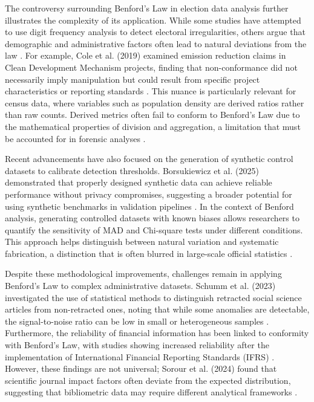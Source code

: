 \documentclass[11pt,a4paper]{article}
\begin{document}
The controversy surrounding Benford's Law in election data analysis further illustrates the complexity of its application. While some studies have attempted to use digit frequency analysis to detect electoral irregularities, others argue that demographic and administrative factors often lead to natural deviations from the law \cite{Cole2019TestingTE}. For example, Cole et al. (2019) examined emission reduction claims in Clean Development Mechanism projects, finding that non-conformance did not necessarily imply manipulation but could result from specific project characteristics or reporting standards \cite{Cole2019TestingTE}. This nuance is particularly relevant for census data, where variables such as population density are derived ratios rather than raw counts. Derived metrics often fail to conform to Benford's Law due to the mathematical properties of division and aggregation, a limitation that must be accounted for in forensic analyses \cite{Druica2018BenfordsLA}.

Recent advancements have also focused on the generation of synthetic control datasets to calibrate detection thresholds. Borsukiewicz et al. (2025) demonstrated that properly designed synthetic data can achieve reliable performance without privacy compromises, suggesting a broader potential for using synthetic benchmarks in validation pipelines \cite{Borsukiewicz2025BeyondRF}. In the context of Benford analysis, generating controlled datasets with known biases allows researchers to quantify the sensitivity of MAD and Chi-square tests under different conditions. This approach helps distinguish between natural variation and systematic fabrication, a distinction that is often blurred in large-scale official statistics \cite{Pinsky2025ComputationAI}.

Despite these methodological improvements, challenges remain in applying Benford's Law to complex administrative datasets. Schumm et al. (2023) investigated the use of statistical methods to distinguish retracted social science articles from non-retracted ones, noting that while some anomalies are detectable, the signal-to-noise ratio can be low in small or heterogeneous samples \cite{Schumm2023CanRS}. Furthermore, the reliability of financial information has been linked to conformity with Benford's Law, with studies showing increased reliability after the implementation of International Financial Reporting Standards (IFRS) \cite{Jianu2021ReliabilityOF}. However, these findings are not universal; Sorour et al. (2024) found that scientific journal impact factors often deviate from the expected distribution, suggesting that bibliometric data may require different analytical frameworks \cite{Sorour2024StatisticalIO}.
\end{document}
